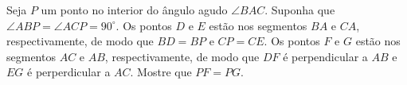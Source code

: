 Seja $P$ um ponto no interior do ângulo agudo $\angle BAC$. Suponha que $\angle ABP = \angle ACP = 90^\circ$. Os pontos $D$ e $E$ estão nos segmentos $BA$ e $CA$, respectivamente, de modo que $BD = BP$ e $CP = CE$. Os pontos $F$ e $G$ estão nos segmentos $AC$ e $AB$, respectivamente, de modo que $DF$ é perpendicular a $AB$ e $EG$ é perperdicular a $AC$. Mostre que $PF = PG$.
